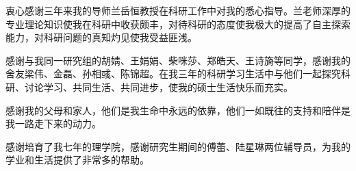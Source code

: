 \begin{acknowledgement}
  衷心感谢三年来我的导师兰岳恒教授在科研工作中对我的悉心指导。兰老师深厚的专业理论知识使我在科研中收获颇丰，对待科研的态度使我极大的提高了自主探索能力，对科研问题的真知灼见使我受益匪浅。

  感谢与我同一研究组的胡婧、王娟娟、柴咪莎、郑皓天、王诗旖等同学，感谢我的舍友梁伟、金磊、孙相彧、陈锦超。在我三年的科研学习生活中与他们一起探究科研、讨论学习、共同生活、共同进步，使我的硕士生活快乐而充实。

  感谢我的父母和家人，他们是我生命中永远的依靠，他们一如既往的支持和陪伴是我一路走下来的动力。

  感谢培育了我七年的理学院，感谢研究生期间的傅蕾、陆星琳两位辅导员，为我的学业和生活提供了非常多的帮助。
\end{acknowledgement}
